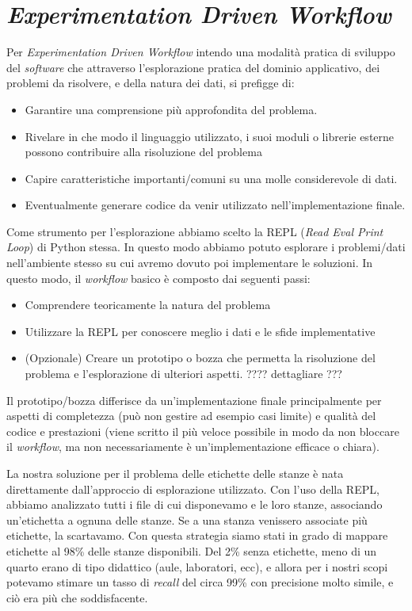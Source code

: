 \documentclass[12pt]{report}
\begin{document}
\section{\textit{Experimentation Driven Workflow}}

Per \textit{Experimentation Driven Workflow} intendo una modalità pratica di sviluppo del \textit{software} che attraverso l'esplorazione pratica del dominio applicativo, dei problemi da risolvere, e della natura dei dati, si prefigge di:

\begin{itemize}
	\item Garantire una comprensione più approfondita del problema.
	\item Rivelare in che modo il linguaggio utilizzato, i suoi moduli o librerie esterne possono contribuire alla risoluzione del problema
	\item Capire caratteristiche importanti/comuni su una molle considerevole di dati.
	\item Eventualmente generare codice da venir utilizzato nell'implementazione finale.
\end{itemize}

Come strumento per l'esplorazione abbiamo scelto la REPL (\textit{Read Eval Print Loop}) di Python stessa. In questo modo abbiamo potuto esplorare i problemi/dati nell'ambiente stesso su cui avremo dovuto poi implementare le soluzioni. In questo modo, il \textit{workflow} basico è composto dai seguenti passi:

\begin{itemize}
	\item Comprendere teoricamente la natura del problema
	\item Utilizzare la REPL per conoscere meglio i dati e le sfide implementative
	\item (Opzionale) Creare un prototipo o bozza che permetta la risoluzione del problema e l'esplorazione di ulteriori aspetti. ???? dettagliare ???
\end{itemize}

Il prototipo/bozza differisce da un'implementazione finale principalmente per aspetti di completezza (può non gestire ad esempio casi limite) e qualità del codice e prestazioni (viene scritto il più veloce possibile in modo da non bloccare il \textit{workflow}, ma non necessariamente è un'implementazione efficace o chiara).

La nostra soluzione per il problema delle etichette delle stanze è nata direttamente dall'approccio di esplorazione utilizzato. Con l'uso della REPL, abbiamo analizzato tutti i file di cui disponevamo e le loro stanze, associando un'etichetta a ognuna delle stanze. Se a una stanza venissero associate più etichette, la scartavamo. Con questa strategia siamo stati in grado di mappare etichette al 98\% delle stanze disponibili. Del 2\% senza etichette, meno di un quarto erano di tipo didattico (aule, laboratori, ecc), e allora per i nostri scopi potevamo stimare un tasso di \textit{recall} del circa 99\% con precisione molto simile, e ciò era più che soddisfacente.
\end{document}
